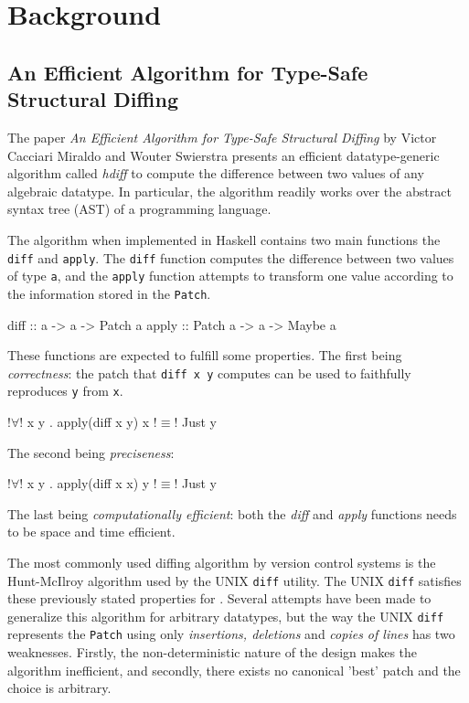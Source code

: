 \section{Background}

\subsection{An Efficient Algorithm for Type-Safe Structural Diffing}
The paper \textit{An Efficient Algorithm for Type-Safe Structural Diffing} by Victor Cacciari Miraldo and Wouter Swierstra presents an efficient datatype-generic algorithm called \textit{hdiff} to compute the difference between two values of any algebraic datatype. In particular, the algorithm readily works over the abstract syntax tree (AST) of a programming language\cite{miraldo2019efficient}.

The algorithm when implemented in Haskell contains two main functions the \texttt{diff} and \texttt{apply}. The \texttt{diff} function computes the difference between two values of type \texttt{a}, and the \texttt{apply} function attempts to transform one value according to the information stored in the \texttt{Patch}.
\begin{haskell}
    diff  :: a -> a -> Patch a
    apply :: Patch a -> a -> Maybe a
\end{haskell}

These functions are expected to fulfill some properties. The first being \textit{correctness}: the patch that \texttt{diff x y} computes can be used to faithfully reproduces \texttt{y} from \texttt{x}.
\begin{haskell}
    !$\forall$! x y . apply(diff x y) x !$\equiv$! Just y
\end{haskell}
The second being \textit{preciseness}:
\begin{haskell}
    !$\forall$! x y . apply(diff x x) y !$\equiv$! Just y
\end{haskell}
The last being \textit{computationally efficient}: both the \textit{diff} and \textit{apply} functions needs to be space and time efficient.

The most commonly used diffing algorithm by version control systems is the Hunt-McIlroy algorithm used by the UNIX \texttt{diff} utility\cite{hunt1976algorithm}. The UNIX \texttt{diff} satisfies these previously stated properties for \cite{miraldo2019efficient}. Several attempts have been made to generalize this algorithm for arbitrary datatypes, but the way the UNIX \texttt{diff} represents the \texttt{Patch} using only \textit{insertions, deletions} and \textit{copies of lines} has two weaknesses. Firstly, the non-deterministic nature of the design makes the algorithm inefficient, and secondly, there exists no canonical 'best' patch and the choice is arbitrary\cite{miraldo2019efficient}.

